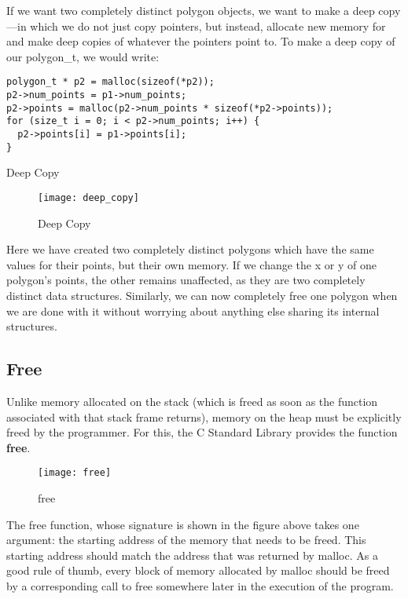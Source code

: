 \documentclass[11pt, a4paper]{article}
\begin{document}
If we want two completely distinct polygon objects, we want to make a deep copy—in which we do not just copy pointers, but instead, allocate new memory for and make deep copies of whatever the pointers point to. To make a deep copy of our polygon\_t, we would write:

\begin{listing}
\begin{verbatim}
polygon_t * p2 = malloc(sizeof(*p2));
p2->num_points = p1->num_points;
p2->points = malloc(p2->num_points * sizeof(*p2->points));
for (size_t i = 0; i < p2->num_points; i++) {
  p2->points[i] = p1->points[i];
}
\end{verbatim}
\caption{Deep Copy}
\label{lst:deep_copy}
\end{listing}


\begin{figure}[htpb]
  \centering
  \texttt{[image: deep\_copy]}
  \caption{Deep Copy}
  \label{fig:deep_copy}
\end{figure}

Here we have created two completely distinct polygons which have the same values for their points, but their own memory. If we change the x or y of one polygon’s points, the other remains unaffected, as they are two completely distinct data structures. Similarly, we can now completely free one polygon when we are done with it without worrying about anything else sharing its internal structures.


\subsection{Free}%
\label{sub:free}


Unlike memory allocated on the stack (which is freed as soon as the function associated with that stack frame returns), memory on the heap must be explicitly freed by the programmer. For this, the C Standard Library provides the function \textbf{free}.


\begin{figure}[htpb]
  \centering
  \texttt{[image: free]}
  \caption{free}
  \label{fig:free}
\end{figure}



The free function, whose signature is shown in the figure above takes one argument: the starting address of the memory that needs to be freed. This starting address should match the address that was returned by malloc. As a good rule of thumb, every block of memory allocated by malloc should be freed by a corresponding call to free somewhere later in the execution of the program.
\end{document}
